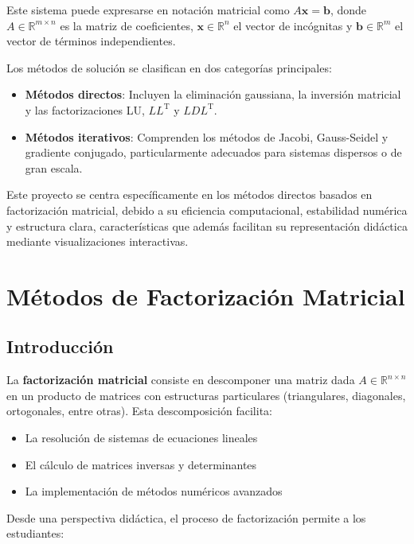 Este sistema puede expresarse en notación matricial como $A\mathbf{x} = \mathbf{b}$, donde $A \in \mathbb{R}^{m \times n}$ es la matriz de coeficientes, $\mathbf{x} \in \mathbb{R}^n$ el vector de incógnitas y $\mathbf{b} \in \mathbb{R}^m$ el vector de términos independientes.

Los métodos de solución se clasifican en dos categorías principales:

\begin{itemize}
	\item \textbf{Métodos directos}: Incluyen la eliminación gaussiana, la inversión matricial y las factorizaciones LU, $LL^{\mathrm{T}}$ y $LDL^{\mathrm{T}}$.
	
	\item \textbf{Métodos iterativos}: Comprenden los métodos de Jacobi, Gauss-Seidel y gradiente conjugado, particularmente adecuados para sistemas dispersos o de gran escala.
\end{itemize}

Este proyecto se centra específicamente en los métodos directos basados en factorización matricial, debido a su eficiencia computacional, estabilidad numérica y estructura clara, características que además facilitan su representación didáctica mediante visualizaciones interactivas.

\section{Métodos de Factorización Matricial}

\subsection{Introducción}

La \textbf{factorización matricial} consiste en descomponer una matriz dada $A \in \mathbb{R}^{n \times n}$ en un producto de matrices con estructuras particulares (triangulares, diagonales, ortogonales, entre otras). Esta descomposición facilita:

\begin{itemize}
	\item La resolución de sistemas de ecuaciones lineales
	\item El cálculo de matrices inversas y determinantes
	\item La implementación de métodos numéricos avanzados
\end{itemize}

Desde una perspectiva didáctica, el proceso de factorización permite a los estudiantes:

